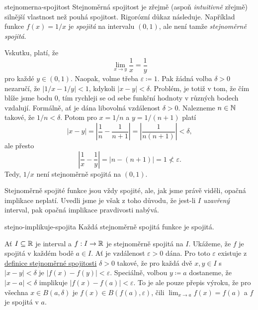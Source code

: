 \begin{example}{}{stejnomerna-spojitost}
 Stejnoměrná spojitost je zřejmě (aspoň \emph{intuitivně} zřejmě) silnější
 vlastnost než pouhá spojitost. Rigorózní důkaz následuje. Například funkce
 $f(x) = 1 / x$ je \emph{spojitá} na intervalu $(0,1)$, ale není tamže
 \emph{stejnoměrně spojitá}.

 Vskutku, platí, že
 \[
  \lim_{x \to y} \frac{1}{x} = \frac{1}{y}
 \]
 pro každé $y \in (0,1)$. Naopak, volme třeba $\varepsilon \coloneqq 1$. Pak
 žádná volba $\delta>0$ nezaručí, že $|1 / x - 1 / y| < 1$, kdykoli
 $|x-y|<\delta$. Problém, je totiž v tom, že čím blíže jsme bodu $0$, tím
 rychleji se od sebe funkční hodnoty v různých bodech vzdalují. Formálně, ať je
 dána libovolná vzdálenost $\delta>0$. Nalezneme $n \in \mathbb{N}$ takové, že $1 / n <
 \delta$. Potom pro $x = 1 / n$ a $y = 1 / (n + 1)$ platí
 \[
  |x - y| = \left| \frac{1}{n} - \frac{1}{n+1} \right| = \left| \frac{1}{n(n+1)}
  \right| < \delta,
 \]
 ale přesto
 \[
  \left| \frac{1}{x} - \frac{1}{y} \right| = \left| n - (n + 1) \right| = 1
  \not< \varepsilon.
 \]
 Tedy, $1 / x$ není stejnoměrně spojitá na $(0,1)$.
\end{example}

Stejnoměrně spojité funkce jsou vždy spojité, ale, jak jsme právě viděli,
opačná implikace neplatí. Uvedli jsme je však z toho důvodu, že jest-li $I$
\emph{uzavřený} interval, pak opačná implikace pravdivosti nabývá.

\begin{proposition}{}{stejno-implikuje-spojita}
 Každá stejnoměrně spojitá funkce je spojitá.
\end{proposition}
\begin{propproof}
 Ať $I \subseteq \mathbb{R}$ je interval a $f:I \to \mathbb{R}$ je stejnoměrně spojitá na $I$.
 Ukážeme, že $f$ je spojitá v každém bodě $a \in I$. Ať je vzdálenost
 $\varepsilon>0$ dána. Pro toto $\varepsilon$ existuje z
 \hyperref[def:stejnomerna-spojitost]{definice stejnoměrné spojitosti}
 $\delta>0$ takové, že pro každá dvě $x,y \in I$ s $|x-y|<\delta$ je $|f(x) -
 f(y)|<\varepsilon$. Speciálně, volbou $y \coloneqq a$ dostaneme, že
 $|x-a|<\delta$ implikuje $|f(x) - f(a)|<\varepsilon$. To je ale pouze přepis
 výroku, že pro všechna $x \in B(a,\delta)$ je $f(x) \in B(f(a),\varepsilon)$,
 čili $\lim_{x \to a} f(x) = f(a)$ a $f$ je spojitá v $a$.
\end{propproof}

